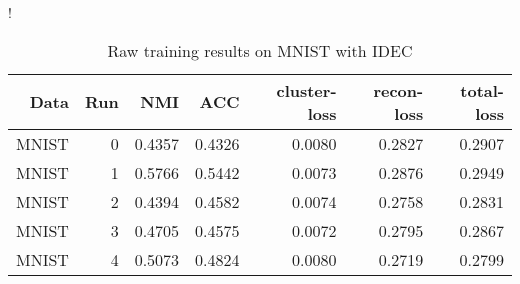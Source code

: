 \begin{table}[ht]
\caption{Raw training results on MNIST with IDEC}\label{tab:idec-raw-MNIST}
\resizebox{\columnwidth}!{
\begin{tabular}{ | r | r | r | r | r | r | r |}
\hline
Data & Run & NMI & ACC & cluster-loss & recon-loss & total-loss  \\ \hline 
MNIST & 0 & 0.4357 & 0.4326 & 0.0080 & 0.2827 & 0.2907 \\ 
MNIST & 1 & 0.5766 & 0.5442 & 0.0073 & 0.2876 & 0.2949 \\ \hdashline 
MNIST & 2 & 0.4394 & 0.4582 & 0.0074 & 0.2758 & 0.2831 \\ 
MNIST & 3 & 0.4705 & 0.4575 & 0.0072 & 0.2795 & 0.2867 \\ \hdashline 
MNIST & 4 & 0.5073 & 0.4824 & 0.0080 & 0.2719 & 0.2799 \\ 
\hline
\end{tabular}
}
\end{table}